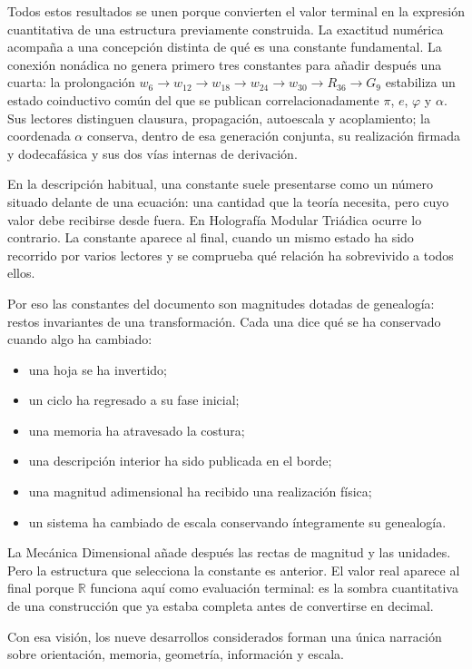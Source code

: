 Todos estos resultados se unen porque convierten el valor terminal en la expresión cuantitativa de una estructura previamente construida. La exactitud numérica acompaña a una concepción distinta de qué es una constante fundamental. La conexión nonádica no genera primero tres constantes para añadir después una cuarta: la prolongación \(w_6\to w_{12}\to w_{18}\to w_{24}\to w_{30}\to R_{36}\to G_9\) estabiliza un estado coinductivo común del que se publican correlacionadamente \(\pi\), \(e\), \(\varphi\) y \(\alpha\). Sus lectores distinguen clausura, propagación, autoescala y acoplamiento; la coordenada \(\alpha\) conserva, dentro de esa generación conjunta, su realización firmada y dodecafásica y sus dos vías internas de derivación.\par

En la descripción habitual, una constante suele presentarse como un número situado delante de una ecuación: una cantidad que la teoría necesita, pero cuyo valor debe recibirse desde fuera. En Holografía Modular Triádica ocurre lo contrario. La constante aparece al final, cuando un mismo estado ha sido recorrido por varios lectores y se comprueba qué relación ha sobrevivido a todos ellos.\par

Por eso las constantes del documento son magnitudes dotadas de genealogía: restos invariantes de una transformación. Cada una dice qué se ha conservado cuando algo ha cambiado:\par

\begin{itemize}[leftmargin=*,itemsep=0.35em]
\item una hoja se ha invertido;
\item un ciclo ha regresado a su fase inicial;
\item una memoria ha atravesado la costura;
\item una descripción interior ha sido publicada en el borde;
\item una magnitud adimensional ha recibido una realización física;
\item un sistema ha cambiado de escala conservando íntegramente su genealogía.
\end{itemize}

La Mecánica Dimensional añade después las rectas de magnitud y las unidades. Pero la estructura que selecciona la constante es anterior. El valor real aparece al final porque \(\mathbb R\) funciona aquí como evaluación terminal: es la sombra cuantitativa de una construcción que ya estaba completa antes de convertirse en decimal.\par

Con esa visión, los nueve desarrollos considerados forman una única narración sobre orientación, memoria, geometría, información y escala.\par
